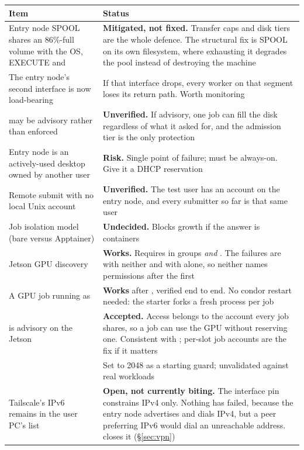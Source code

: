 \begin{table}[H]
\centering
\begin{tabularx}{\textwidth}{L{0.36\textwidth} Y}
\toprule
\textbf{Item} & \textbf{Status} \\
\midrule
Entry node SPOOL shares an 86\%-full volume with the OS, EXECUTE and  & \textbf{Mitigated, not fixed.} Transfer caps and disk tiers are the whole defence. The structural fix is SPOOL on its own filesystem, where exhausting it degrades the pool instead of destroying the machine \\
The entry node's second interface is now load-bearing & If that interface drops, every worker on that segment loses its return path. Worth monitoring \\
 may be advisory rather than enforced & \textbf{Unverified.} If advisory, one job can fill the disk regardless of what it asked for, and the admission tier is the only protection \\
Entry node is an actively-used desktop owned by another user & \textbf{Risk.} Single point of failure; must be always-on. Give it a DHCP reservation \\
Remote submit with no local Unix account & \textbf{Unverified.} The test user has an account on the entry node, and every submitter so far is that same user \\
Job isolation model (bare versus Apptainer) & \textbf{Undecided.} Blocks growth if the answer is containers \\
Jetson GPU discovery & \textbf{Works.} Requires  in groups  \emph{and} . The failures are  with neither and  with  alone, so neither names permissions after the first \\
A GPU job running as  & \textbf{Works} after , verified end to end. No condor restart needed: the starter forks a fresh process per job \\
 is advisory on the Jetson & \textbf{Accepted.} Access belongs to the account every job shares, so a job can use the GPU without reserving one. Consistent with ; per-slot job accounts are the fix if it matters \\
 & Set to 2048 as a starting guard; unvalidated against real workloads \\
Tailscale's IPv6 remains in the user PC's  list & \textbf{Open, not currently biting.} The interface pin constrains IPv4 only. Nothing has failed, because the entry node advertises and dials IPv4, but a peer preferring IPv6 would dial an unreachable address.  closes it (\S\ref{sec:vpn}) \\

\end{tabularx}
\end{table}
